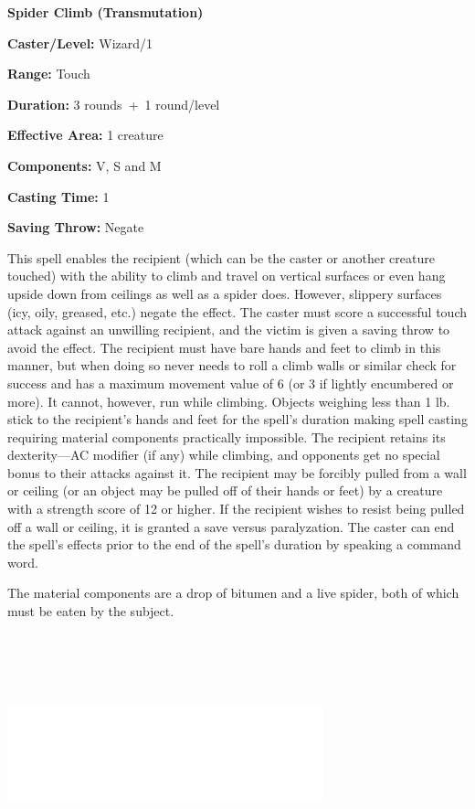 \begin{multicols}{2}
\begin{minipage}{\columnwidth}
\noindent \textbf{Spider Climb (Transmutation)}

\noindent \textbf{Caster/Level:} Wizard/1

\noindent \textbf{Range:} Touch

\noindent \textbf{Duration:} 3 rounds~+~1 round/level

\noindent \textbf{Effective Area:} 1 creature

\noindent \textbf{Components:} V, S and M

\noindent \textbf{Casting Time:} 1

\noindent \textbf{Saving Throw:} Negate

\end{minipage}

This spell enables the recipient (which can be the caster or another creature touched) with the ability to climb and travel on vertical surfaces or even hang upside down from ceilings as well as a spider does.  However, slippery surfaces (icy, oily, greased, etc.) negate the effect.  The caster must score a successful touch attack against an unwilling recipient, and the victim is given a saving throw to avoid the effect.  The recipient must have bare hands and feet to climb in this manner, but when doing so never needs to roll a climb walls or similar check for success and has a maximum movement value of 6 (or 3 if lightly encumbered or more).  It cannot, however, run while climbing.  Objects weighing less than 1 lb. stick to the recipient's hands and feet for the spell's duration making spell casting requiring material components practically impossible.  The recipient retains its dexterity---AC modifier (if any) while climbing, and opponents get no special bonus to their attacks against it.  The recipient may be forcibly pulled from a wall or ceiling (or an object may be pulled off of their hands or feet) by a creature with a strength score of 12 or higher.  If the recipient wishes to resist being pulled off a wall or ceiling, it is granted a save versus paralyzation.  The caster can end the spell's effects prior to the end of the spell's duration by speaking a command word.

The material components are a drop of bitumen and a live spider, both of which must be eaten by the subject.

\noindent\includegraphics[width=3.6in, height=2.75in]{testblock.pdf}


\end{multicols}
